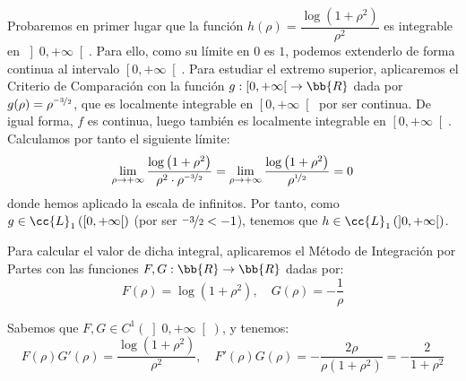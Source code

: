 \begin{ejercicio}
    Probaremos en primer lugar que la función $h(\rho)=\dfrac{\log\left(1+\rho^2\right)}{\rho^2}$ es integrable en $\left]0, +\infty\right[$. Para ello, como su límite en $0$ es $1$,
    podemos extenderlo de forma continua al intervalo $\left[0, +\infty\right[$.
    Para estudiar el extremo superior, aplicaremos el Criterio de Comparación con la función $g:\left[0, +\infty\right[\to \bb{R}$ dada por $g(\rho)=\rho^{\nicefrac{-3}{2}}$, que es localmente integrable en $\left[0, +\infty\right[$ por ser continua.
    De igual forma, $f$ es continua, luego también es localmente integrable en $\left[0, +\infty\right[$.
    Calculamos por tanto el siguiente límite:
    \begin{align*}
        \lim_{\rho\to +\infty} \dfrac{\log\left(1+\rho^2\right)}{\rho^2\cdot \rho^{\nicefrac{-3}{2}}}
        = \lim_{\rho\to +\infty} \dfrac{\log\left(1+\rho^2\right)}{\rho^{\nicefrac{1}{2}}} = 0
    \end{align*}
    donde hemos aplicado la escala de infinitos. Por tanto, como $g\in \cc{L}_1\left(\left[0, +\infty\right[\right)$ (por ser $\nicefrac{-3}{2}<-1$), tenemos que $h\in \cc{L}_1\left(\left]0, +\infty\right[\right)$.

    Para calcular el valor de dicha integral, aplicaremos el Método de Integración por Partes con las funciones $F,G:\bb{R}\to \bb{R}$ dadas por:
    \begin{equation*}
        F(\rho) = \log\left(1+\rho^2\right), \quad G(\rho) = -\dfrac{1}{\rho}
    \end{equation*}

    Sabemos que $F,G\in C^1\left(\left]0, +\infty\right[\right)$, y tenemos:
    \begin{equation*}
        F(\rho)G'(\rho) = \dfrac{\log\left(1+\rho^2\right)}{\rho^2}, \quad F'(\rho)G(\rho) = -\dfrac{2\rho}{\rho\left(1+\rho^2\right)} = -\dfrac{2}{1+\rho^2}
    \end{equation*}


\end{ejercicio}
